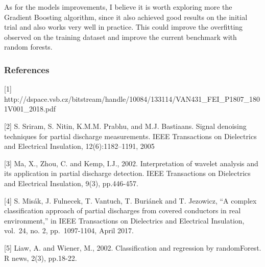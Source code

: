 \documentclass[11pt]{article}
\begin{document}
As for the models improvements, I believe it is worth exploring more the
Gradient Boosting algorithm, since it also achieved good results on the
initial trial and also works very well in practice. This could improve
the overfitting observed on the training dataset and improve the current
benchmark with random forests.

    \hypertarget{references}{%
\subsubsection{References}\label{references}}

{[}1{]}
http://dspace.vsb.cz/bitstream/handle/10084/133114/VAN431\_FEI\_P1807\_1801V001\_2018.pdf

{[}2{]} S. Sriram, S. Nitin, K.M.M. Prabhu, and M.J. Bastiaans. Signal
denoising techniques for partial discharge measurements. IEEE
Transactions on Dielectrics and Electrical Insulation, 12(6):1182--1191,
2005

{[}3{]} Ma, X., Zhou, C. and Kemp, I.J., 2002. Interpretation of wavelet
analysis and its application in partial discharge detection. IEEE
Transactions on Dielectrics and Electrical Insulation, 9(3), pp.446-457.

{[}4{]} S. Misák, J. Fulnecek, T. Vantuch, T. Buriánek and T. Jezowicz,
``A complex classification approach of partial discharges from covered
conductors in real environment,'' in IEEE Transactions on Dielectrics
and Electrical Insulation, vol.~24, no. 2, pp.~1097-1104, April 2017.

{[}5{]} Liaw, A. and Wiener, M., 2002. Classification and regression by
randomForest. R news, 2(3), pp.18-22.


    
    
    
    
\end{document}
